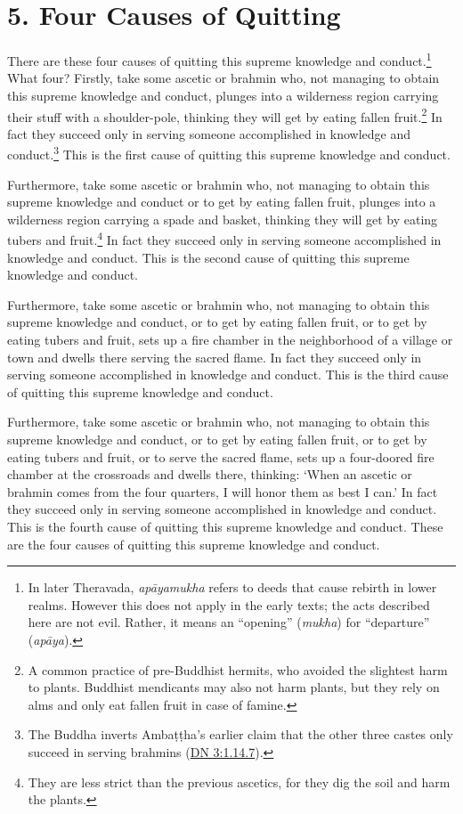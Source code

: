 \documentclass[12pt,openany]{book}%
\begin{document}
\section*{5. Four Causes of Quitting }

There are these four causes of quitting this supreme knowledge and conduct.\footnote{In later Theravada, \textit{\textsanskrit{apāyamukha}} refers to deeds that cause rebirth in lower realms. However this does not apply in the early texts; the acts described here are not evil. Rather, it means an “opening” (\textit{mukha}) for “departure” (\textit{\textsanskrit{apāya}}). } What four? Firstly, take some ascetic or brahmin who, not managing to obtain this supreme knowledge and conduct, plunges into a wilderness region carrying their stuff with a shoulder-pole, thinking they will get by eating fallen fruit.\footnote{A common practice of pre-Buddhist hermits, who avoided the slightest harm to plants. Buddhist mendicants may also not harm plants, but they rely on alms and only eat fallen fruit in case of famine. } In fact they succeed only in serving someone accomplished in knowledge and conduct.\footnote{The Buddha inverts \textsanskrit{Ambaṭṭha}’s earlier claim that the other three castes only succeed in serving brahmins (\href{https://suttacentral.net/dn3/en/sujato\#1.14.7}{DN 3:1.14.7}). } This is the first cause of quitting this supreme knowledge and conduct. 

Furthermore, take some ascetic or brahmin who, not managing to obtain this supreme knowledge and conduct or to get by eating fallen fruit, plunges into a wilderness region carrying a spade and basket, thinking they will get by eating tubers and fruit.\footnote{They are less strict than the previous ascetics, for they dig the soil and harm the plants. } In fact they succeed only in serving someone accomplished in knowledge and conduct. This is the second cause of quitting this supreme knowledge and conduct. 

Furthermore, take some ascetic or brahmin who, not managing to obtain this supreme knowledge and conduct, or to get by eating fallen fruit, or to get by eating tubers and fruit, sets up a fire chamber in the neighborhood of a village or town and dwells there serving the sacred flame. In fact they succeed only in serving someone accomplished in knowledge and conduct. This is the third cause of quitting this supreme knowledge and conduct. 

Furthermore, take some ascetic or brahmin who, not managing to obtain this supreme knowledge and conduct, or to get by eating fallen fruit, or to get by eating tubers and fruit, or to serve the sacred flame, sets up a four-doored fire chamber at the crossroads and dwells there, thinking: ‘When an ascetic or brahmin comes from the four quarters, I will honor them as best I can.’ In fact they succeed only in serving someone accomplished in knowledge and conduct. This is the fourth cause of quitting this supreme knowledge and conduct. These are the four causes of quitting this supreme knowledge and conduct. 
\end{document}
